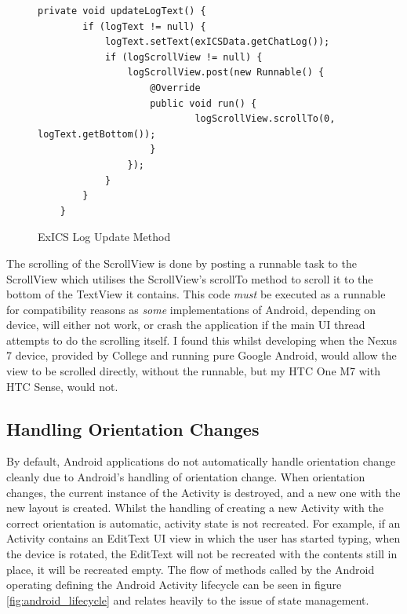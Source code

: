 \begin{figure}[!htpb]
	\centering
	\lstset{language=Java}
	\begin{lstlisting}[tabsize=2,breaklines=true]
	private void updateLogText() {
		if (logText != null) {
			logText.setText(exICSData.getChatLog());
			if (logScrollView != null) {
				logScrollView.post(new Runnable() {
					@Override
					public void run() {
							logScrollView.scrollTo(0, logText.getBottom());
					}
				});
			}
		}
	}
	\end{lstlisting}
	\caption{ExICS Log Update Method}
	\label{fig:exics_log_update}
\end{figure}

The scrolling of the ScrollView is done by posting a runnable task to the ScrollView which utilises the ScrollView's scrollTo method to scroll it to the bottom of the TextView it contains.  This code \textit{must} be executed as a runnable for compatibility reasons as \textit{some} implementations of Android, depending on device, will either not work, or crash the application if the main UI thread attempts to do the scrolling itself.  I found this whilst developing when the Nexus 7 device, provided by College and running pure Google Android, would allow the view to be scrolled directly, without the runnable, but my HTC One M7 with HTC Sense, would not.

\subsection{Handling Orientation Changes}
\label{subs:handling_orientation_changes}

By default, Android applications do not automatically handle orientation change cleanly due to Android's handling of orientation change.  When orientation changes, the current instance of the Activity is destroyed, and a new one with the new layout is created.  Whilst the handling of creating a new Activity with the correct orientation is automatic, activity state is not recreated.  For example, if an Activity contains an EditText\cite{androidEditText} UI view in which the user has started typing, when the device is rotated, the EditText will not be recreated with the contents still in place, it will be recreated empty.  The flow of methods called by the Android operating defining the Android Activity lifecycle can be seen in figure \ref{fig:android_lifecycle} and relates heavily to the issue of state management.

\FloatBarrier

